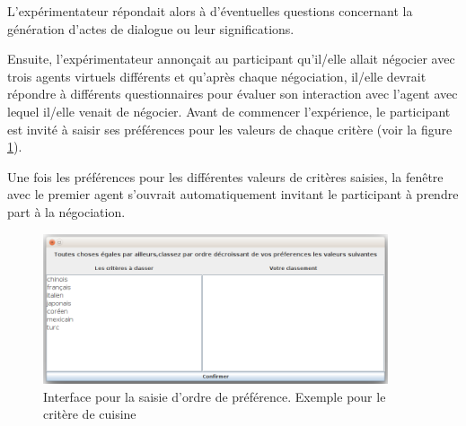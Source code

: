 		L’expérimentateur répondait alors à d’éventuelles questions concernant la génération d'actes de dialogue ou leur significations.
		
		Ensuite, l’expérimentateur annonçait au participant qu’il/elle allait négocier avec trois  agents virtuels différents et
		qu’après chaque négociation, il/elle devrait répondre à différents questionnaires pour évaluer son interaction avec l’agent avec lequel il/elle venait de négocier.  Avant de commencer l'expérience, le participant est invité à saisir ses préférences pour les valeurs de chaque critère (voir la figure \ref{fig:pref}).
		
		Une fois les préférences pour les différentes valeurs de critères saisies, la fenêtre avec le premier agent s'ouvrait automatiquement invitant le participant à prendre part à la négociation. 
		
		\begin{figure}[b]
			\includegraphics[width=4in]{Figures/pref.png}
			\caption{\label{fig:pref} Interface pour la saisie d'ordre de préférence. Exemple pour le critère de cuisine}
		\end{figure} 

	
